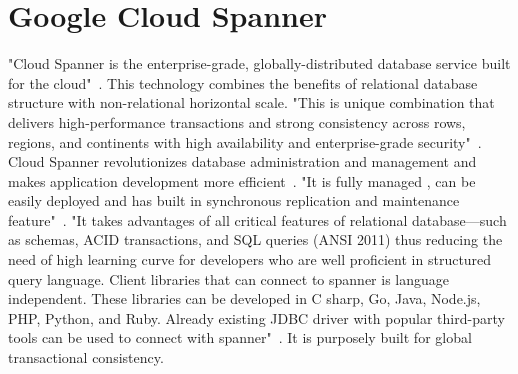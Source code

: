 \section{Google Cloud Spanner}

"Cloud Spanner is the enterprise-grade, globally-distributed database 
service built for the cloud"~\cite{hid-sp18-523-www-google-spanner}. 
This technology combines the benefits of relational database structure 
with non-relational horizontal scale. "This is unique combination that 
delivers high-performance transactions and strong consistency across rows, 
regions, and continents with high availability and enterprise-grade 
security"~\cite{hid-sp18-523-www-google-spanner}. Cloud Spanner 
revolutionizes database administration and management and makes 
application development more efficient~\cite{hid-sp18-523-www-google-spanner}.
"It is fully managed , can be easily deployed and has built in synchronous 
replication and maintenance feature"~\cite{hid-sp18-523-www-google-spanner}. 
"It takes advantages of all critical features of relational database—such 
as schemas, ACID transactions, and SQL queries (ANSI 2011) thus reducing 
the need of high learning curve for developers who are well proficient in 
structured query language. 
Client libraries that can connect to spanner is language independent. 
These libraries can be developed in C sharp, Go, Java, Node.js, PHP, Python, 
and Ruby. Already existing JDBC driver with popular third-party tools can be 
used to connect with spanner"~\cite{hid-sp18-523-www-google-spanner}. It is 
purposely built for global transactional consistency.
